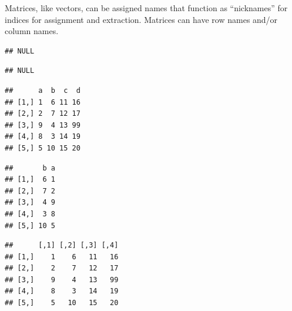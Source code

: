 \documentclass[krantz2]{krantz}\usepackage{knitr}
\begin{document}
Matrices, like vectors, can be assigned names that function as ``nicknames'' for indices for assignment and extraction. Matrices can have row names and/or column names.

\begin{knitrout}\footnotesize
{}\color{fgcolor}\begin{kframe}
\begin{alltt}
\end{alltt}
\begin{verbatim}
## NULL
\end{verbatim}
\begin{alltt}
\end{alltt}
\begin{verbatim}
## NULL
\end{verbatim}
\begin{alltt}
 \hlkwb{<-} \hlstd{(}\hlstd{,} \hlstd{,} \hlstd{,} \hlstd{)}
\end{alltt}
\begin{verbatim}
##      a  b  c  d
## [1,] 1  6 11 16
## [2,] 2  7 12 17
## [3,] 9  4 13 99
## [4,] 8  3 14 19
## [5,] 5 10 15 20
\end{verbatim}
\begin{alltt}
\hlstd{A[ ,} \hlstd{(}\hlstd{,} \hlstd{)]}
\end{alltt}
\begin{verbatim}
##       b a
## [1,]  6 1
## [2,]  7 2
## [3,]  4 9
## [4,]  3 8
## [5,] 10 5
\end{verbatim}
\begin{alltt}
 \hlkwb{<-} 
\end{alltt}
\begin{verbatim}
##      [,1] [,2] [,3] [,4]
## [1,]    1    6   11   16
## [2,]    2    7   12   17
## [3,]    9    4   13   99
## [4,]    8    3   14   19
## [5,]    5   10   15   20
\end{verbatim}
\end{kframe}
\end{knitrout}
\end{document}
